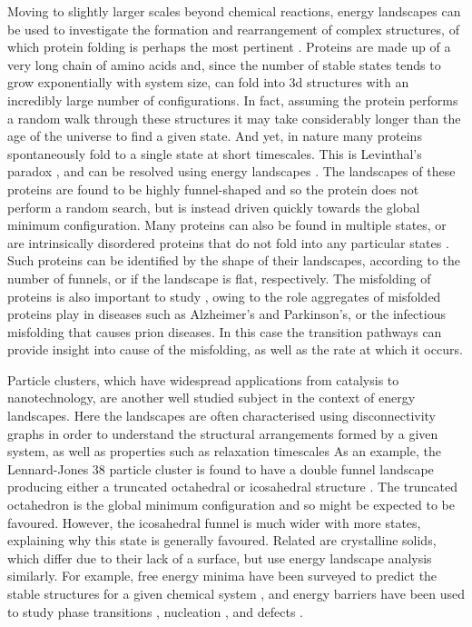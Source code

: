 Moving to slightly larger scales beyond chemical reactions, energy landscapes can be used to investigate the formation and rearrangement of complex structures, of which protein folding is perhaps the most pertinent \cite{Bryngelson1995,Onuchic1997}.
Proteins are made up of a very long chain of amino acids and, since the number of stable states tends to grow exponentially with system size, can fold into 3d structures with an incredibly large number of configurations.
In fact, assuming the protein performs a random walk through these structures it may take considerably longer than the age of the universe to find a given state.
And yet, in nature many proteins spontaneously fold to a single state at short timescales.
This is Levinthal's paradox \cite{Zwanzig1992}, and can be resolved using energy landscapes \cite{Bryngelson1995}.
The landscapes of these proteins are found to be highly funnel-shaped and so the protein does not perform a random search, but is instead driven quickly towards the global minimum configuration.
Many proteins can also be found in multiple states, or are intrinsically disordered proteins that do not fold into any particular states \cite{Chong2019}.
Such proteins can be identified by the shape of their landscapes, according to the number of funnels, or if the landscape is flat, respectively.
The misfolding of proteins is also important to study \cite{Yu2015}, owing to the role aggregates of misfolded proteins play in diseases such as Alzheimer's and Parkinson's, or the infectious misfolding that causes prion diseases.
In this case the transition pathways can provide insight into cause of the misfolding, as well as the rate at which it occurs.

Particle clusters, which have widespread applications from catalysis to nanotechnology, are another well studied subject in the context of energy landscapes.
Here the landscapes are often characterised using disconnectivity graphs in order to understand the structural arrangements formed by a given system, as well as properties such as relaxation timescales \cite{Wales1998,Wales2012}
As an example, the Lennard-Jones 38 particle cluster is found to have a double funnel landscape producing either a truncated octahedral or icosahedral structure \cite{Doye1999}.
The truncated octahedron is the global minimum configuration and so might be expected to be favoured.
However, the icosahedral funnel is much wider with more states, explaining why this state is generally favoured.
Related are crystalline solids, which differ due to their lack of a surface, but use energy landscape analysis similarly.
For example, free energy minima have been surveyed to predict the stable structures for a given chemical system \cite{Oganov2009,Jansen2014,Allan2021}, and energy barriers have been used to study phase transitions \cite{Jansen2010}, nucleation \cite{Richard2018}, and defects \cite{Ogata2005,Allan2021}.

